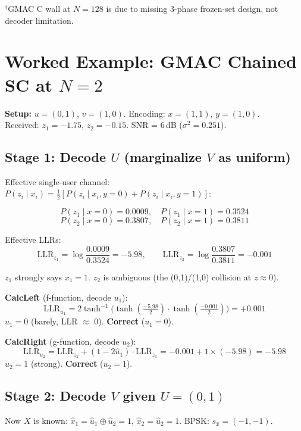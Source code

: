 \documentclass[11pt]{article}
\begin{document}
{\footnotesize $^\dagger$GMAC C wall at $N=128$ is due to missing 3-phase frozen-set design, not decoder limitation.}

\newpage
\section{Worked Example: GMAC Chained SC at $N=2$}

\textbf{Setup:} $u = (0,1)$, $v = (1,0)$. Encoding: $x = (1,1)$, $y = (1,0)$.\\
Received: $z_1 = -1.75$, $z_2 = -0.15$. SNR = 6\,dB ($\sigma^2 = 0.251$).

\subsection*{Stage 1: Decode $U$ (marginalize $V$ as uniform)}

Effective single-user channel: $P(z_i \mid x_i) = \tfrac{1}{2}[P(z_i \mid x_i, y{=}0) + P(z_i \mid x_i, y{=}1)]$:

\[
P(z_1 \mid x{=}0) = 0.0009, \quad P(z_1 \mid x{=}1) = 0.3524
\]
\[
P(z_2 \mid x{=}0) = 0.3807, \quad P(z_2 \mid x{=}1) = 0.3811
\]

Effective LLRs:
\[
\text{LLR}_{z_1} = \log\frac{0.0009}{0.3524} = -5.98, \qquad
\text{LLR}_{z_2} = \log\frac{0.3807}{0.3811} = -0.001
\]

$z_1$ strongly says $x_1 = 1$. $z_2$ is ambiguous (the (0,1)/(1,0) collision at $z \approx 0$).

\medskip
\textbf{CalcLeft} (f-function, decode $u_1$):
\[
\text{LLR}_{u_1} = 2\tanh^{-1}\!\bigl(\tanh(\tfrac{-5.98}{2}) \cdot \tanh(\tfrac{-0.001}{2})\bigr) = +0.001
\]
$\hat{u}_1 = 0$ \; (barely, LLR $\approx$ 0). \textbf{Correct} ($u_1 = 0$).

\medskip
\textbf{CalcRight} (g-function, decode $u_2$):
\[
\text{LLR}_{u_2} = \text{LLR}_{z_2} + (1 - 2\hat{u}_1) \cdot \text{LLR}_{z_1} = -0.001 + 1 \times (-5.98) = -5.98
\]
$\hat{u}_2 = 1$ \; (strong). \textbf{Correct} ($u_2 = 1$).

\subsection*{Stage 2: Decode $V$ given $\hat{U} = (0,1)$}

Now $X$ is known: $\hat{x}_1 = \hat{u}_1 \oplus \hat{u}_2 = 1$, $\hat{x}_2 = \hat{u}_2 = 1$. BPSK: $s_{\hat{x}} = (-1, -1)$.
\end{document}
